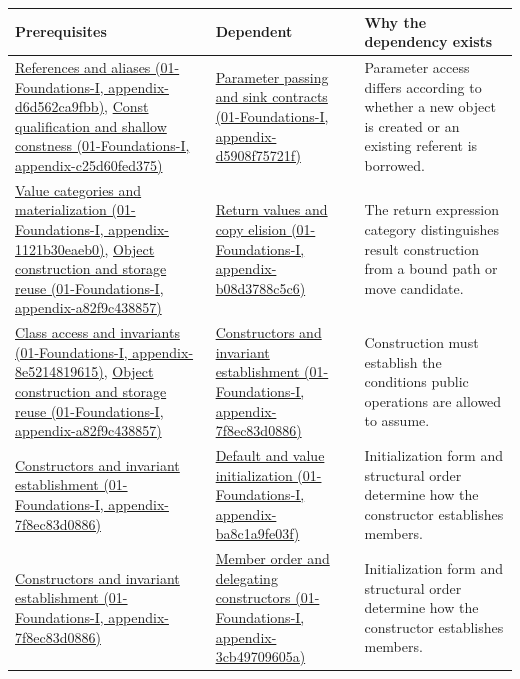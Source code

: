 {\def\LTcaptype{none} %
\begin{longtable}[]{@{}
  >{\raggedright\arraybackslash}p{}
  >{\raggedright\arraybackslash}p{}
  >{\raggedright\arraybackslash}p{}@{}}
\toprule\noalign{}
\begin{minipage}[b]{\linewidth}\raggedright
Prerequisites
\end{minipage} & \begin{minipage}[b]{\linewidth}\raggedright
Dependent
\end{minipage} & \begin{minipage}[b]{\linewidth}\raggedright
Why the dependency exists
\end{minipage} \\
\midrule\noalign{}
\endhead
\bottomrule\noalign{}
\endlastfoot
\href{}{References and aliases (01-Foundations-I, appendix-d6d562ca9fbb)}, \href{}{Const qualification and shallow constness (01-Foundations-I, appendix-c25d60fed375)} & \href{}{Parameter passing and sink contracts (01-Foundations-I, appendix-d5908f75721f)} & Parameter access differs according to whether a new object is created or an existing referent is borrowed. \\
\href{}{Value categories and materialization (01-Foundations-I, appendix-1121b30eaeb0)}, \href{}{Object construction and storage reuse (01-Foundations-I, appendix-a82f9c438857)} & \href{}{Return values and copy elision (01-Foundations-I, appendix-b08d3788c5c6)} & The return expression category distinguishes result construction from a bound path or move candidate. \\
\href{}{Class access and invariants (01-Foundations-I, appendix-8e5214819615)}, \href{}{Object construction and storage reuse (01-Foundations-I, appendix-a82f9c438857)} & \href{}{Constructors and invariant establishment (01-Foundations-I, appendix-7f8ec83d0886)} & Construction must establish the conditions public operations are allowed to assume. \\
\href{}{Constructors and invariant establishment (01-Foundations-I, appendix-7f8ec83d0886)} & \href{}{Default and value initialization (01-Foundations-I, appendix-ba8c1a9fe03f)} & Initialization form and structural order determine how the constructor establishes members. \\
\href{}{Constructors and invariant establishment (01-Foundations-I, appendix-7f8ec83d0886)} & \href{}{Member order and delegating constructors (01-Foundations-I, appendix-3cb49709605a)} & Initialization form and structural order determine how the constructor establishes members. \\

\end{longtable}}
